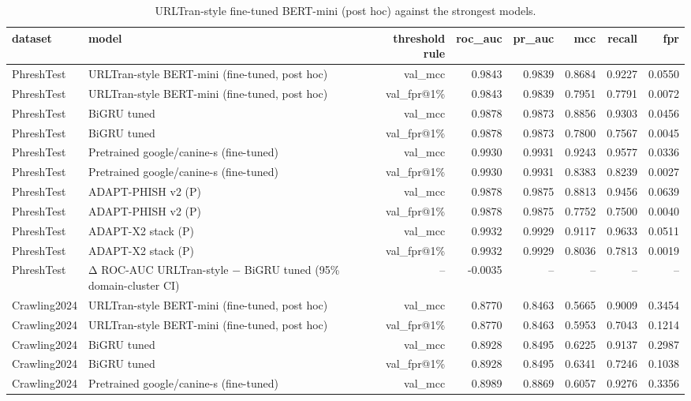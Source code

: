 \begin{table}[t]
\centering
\scriptsize
\caption{URLTran-style fine-tuned BERT-mini (post hoc) against the strongest models.}
\label{tab:rev_R19_urltran_style_bert}
\begin{tabular}{llrrrrrr}
\toprule
dataset & model & threshold rule & roc\_auc & pr\_auc & mcc & recall & fpr \\
\midrule
PhreshTest & URLTran-style BERT-mini (fine-tuned, post hoc) & val\_mcc & 0.9843 & 0.9839 & 0.8684 & 0.9227 & 0.0550 \\
PhreshTest & URLTran-style BERT-mini (fine-tuned, post hoc) & val\_fpr@1\% & 0.9843 & 0.9839 & 0.7951 & 0.7791 & 0.0072 \\
PhreshTest & BiGRU tuned & val\_mcc & 0.9878 & 0.9873 & 0.8856 & 0.9303 & 0.0456 \\
PhreshTest & BiGRU tuned & val\_fpr@1\% & 0.9878 & 0.9873 & 0.7800 & 0.7567 & 0.0045 \\
PhreshTest & Pretrained google/canine-s (fine-tuned) & val\_mcc & 0.9930 & 0.9931 & 0.9243 & 0.9577 & 0.0336 \\
PhreshTest & Pretrained google/canine-s (fine-tuned) & val\_fpr@1\% & 0.9930 & 0.9931 & 0.8383 & 0.8239 & 0.0027 \\
PhreshTest & ADAPT-PHISH v2 (P) & val\_mcc & 0.9878 & 0.9875 & 0.8813 & 0.9456 & 0.0639 \\
PhreshTest & ADAPT-PHISH v2 (P) & val\_fpr@1\% & 0.9878 & 0.9875 & 0.7752 & 0.7500 & 0.0040 \\
PhreshTest & ADAPT-X2 stack (P) & val\_mcc & 0.9932 & 0.9929 & 0.9117 & 0.9633 & 0.0511 \\
PhreshTest & ADAPT-X2 stack (P) & val\_fpr@1\% & 0.9932 & 0.9929 & 0.8036 & 0.7813 & 0.0019 \\
PhreshTest & Δ ROC-AUC URLTran-style − BiGRU tuned (95\% domain-cluster CI) & -- & -0.0035 & -- & -- & -- & -- \\
Crawling2024 & URLTran-style BERT-mini (fine-tuned, post hoc) & val\_mcc & 0.8770 & 0.8463 & 0.5665 & 0.9009 & 0.3454 \\
Crawling2024 & URLTran-style BERT-mini (fine-tuned, post hoc) & val\_fpr@1\% & 0.8770 & 0.8463 & 0.5953 & 0.7043 & 0.1214 \\
Crawling2024 & BiGRU tuned & val\_mcc & 0.8928 & 0.8495 & 0.6225 & 0.9137 & 0.2987 \\
Crawling2024 & BiGRU tuned & val\_fpr@1\% & 0.8928 & 0.8495 & 0.6341 & 0.7246 & 0.1038 \\
Crawling2024 & Pretrained google/canine-s (fine-tuned) & val\_mcc & 0.8989 & 0.8869 & 0.6057 & 0.9276 & 0.3356 \\

\end{tabular}
\end{table}

